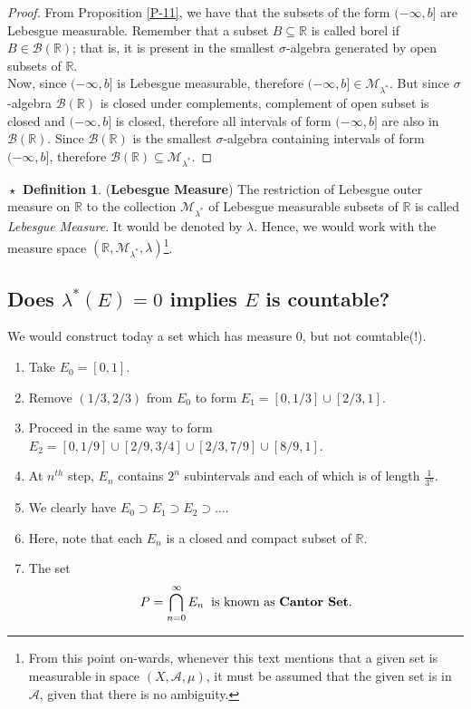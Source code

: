 \documentclass{article}
\theoremstyle{definition}
\newtheorem{definition}{$\boxed{\star}$ Definition}
\theoremstyle{remark}
\theoremstyle{definition}
\theoremstyle{definition}
\theoremstyle{definition}
\newcommand{\union}{\cup}
\newcommand{\bintrs}{\bigcap}
\newcommand{\R}{\mathbb{R}}
\newcommand{\alg}[1]{\mathscr{#1}}
\newcommand{\bor}[1]{\mathscr{B}(#1)}
\newcommand{\lom}[1]{\lambda^*\left (#1\right )}
\newcommand{\set}[1]{\mathscr{#1}}
\newcommand{\msigm}[1]{\set{M}_{#1}}
\begin{document}
\begin{proof}
	From Proposition \ref{P-11}, we have that the subsets of the form $ (-\infty,b] $ are Lebesgue measurable. Remember that a subset $ B\subseteq \R $ is called borel if $ B\in \bor{\R} $; that is, it is present in the smallest $ \sigma $-algebra generated by open subsets of $ \R $. \\
	Now, since $ (-\infty,b] $ is Lebesgue measurable, therefore $ (-\infty,b] \in \msigm{\lambda^*} $. But since $ \sigma $-algebra $ \bor{\R} $ is closed under complements, complement of open subset is closed and $ (-\infty,b] $ is closed, therefore all intervals of form $ (-\infty,b] $ are also in $ \bor{\R} $. Since $ \bor{\R} $ is the smallest $ \sigma $-algebra containing intervals of form $ (-\infty,b] $, therefore $ \bor{\R} \subseteq \msigm{\lambda^*} $.
\end{proof}
\hrulefill
\newpage
\begin{definition}
	(\textbf{Lebesgue Measure}) The restriction of Lebesgue outer measure on $ \R $ to the collection $ \msigm{\lambda^*} $ of Lebesgue measurable subsets of $ \R $ is called \emph{Lebesgue Measure}. It would be denoted by $ \lambda $. Hence, we would work with the measure space $ (\R,\msigm{\lambda^*},\lambda) $\footnote{From this point on-wards, whenever this text mentions that a given set is measurable in space $ (X,\alg{A},\mu) $, it must be assumed that the given set is in $ \alg{A} $, given that there is no ambiguity.}.
\end{definition}
\hrulefill
\subsection{Does $ \lom{E} = 0 $ implies $ E $ is countable?}
We would construct today a set which has measure 0, but not countable(!).
\begin{enumerate}
	\item {Take $ E_0 = [0,1] $.}
	\item {Remove $ (1/3,2/3) $ from $ E_0 $ to form $ E_1 = [0,1/3] \union [2/3,1] $.}
	\item {Proceed in the same way to form $ E_2 = [0,1/9]\union [2/9,3/4] \union [2/3,7/9]\union [8/9,1] $.}
	\item {At $ n^{th} $ step, $ E_n $ contains $ 2^n $ subintervals and each of which is of length $ \frac{1}{3^n} $.}
	\item {We clearly have $ E_0 \supset E_1 \supset E_2 \supset \dots $.}
	\item {Here, note that each $ E_n $ is a closed and compact subset of $ \R $.}
	\item {The set 
\[P = \bintrs_{n=0}^{\infty} E_n \;\;\text{is known as \textbf{Cantor Set}.}\]	
}
\end{enumerate}
\end{document}
